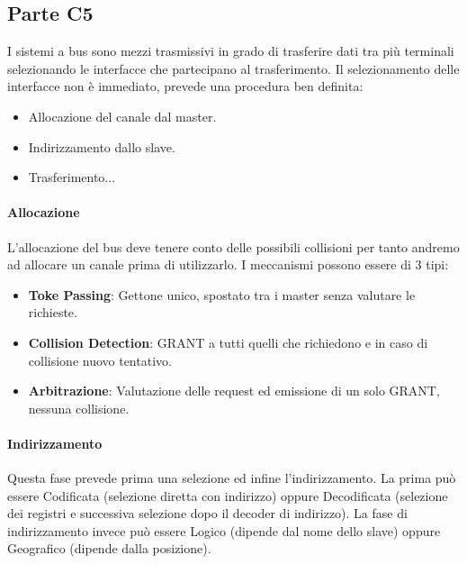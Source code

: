 \documentclass[12pt]{article}
\begin{document}
\subsection{Parte C5}\label{c5} %
I sistemi a bus sono mezzi trasmissivi in grado di trasferire dati tra più terminali selezionando le interfacce che partecipano al trasferimento. Il selezionamento delle interfacce non è immediato, prevede una procedura ben definita:
\begin{itemize}
  \item Allocazione del canale dal master.
  \item Indirizzamento dallo slave.
  \item Trasferimento...
\end{itemize}
\paragraph{Allocazione} L'allocazione del bus deve tenere conto delle possibili collisioni per tanto andremo ad allocare un canale prima di utilizzarlo. I meccanismi possono essere di 3 tipi:
\begin{itemize}
  \item \textbf{Toke Passing}: Gettone unico, spostato tra i master senza valutare le richieste.
  \item \textbf{Collision Detection}: GRANT a tutti quelli che richiedono e in caso di collisione nuovo tentativo.
  \item \textbf{Arbitrazione}: Valutazione delle request ed emissione di un solo GRANT, nessuna collisione.
\end{itemize}
\paragraph{Indirizzamento} Questa fase prevede prima una selezione ed infine l'indirizzamento. La prima può essere Codificata (selezione diretta con indirizzo) oppure Decodificata (selezione dei registri e successiva selezione dopo il decoder di indirizzo). La fase di indirizzamento invece può essere Logico (dipende dal nome dello slave) oppure Geografico (dipende dalla posizione).
\end{document}
